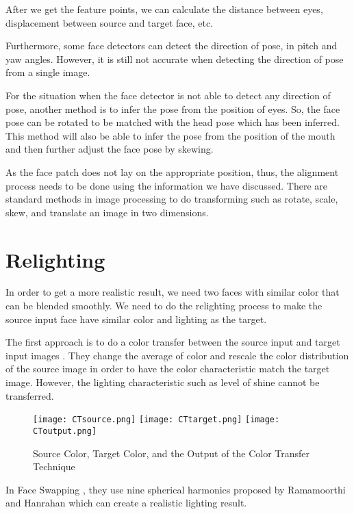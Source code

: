 After we get the feature points, we can calculate the distance between eyes, displacement between source and target face, etc.

Furthermore, some face detectors can detect the direction of pose, in pitch and yaw angles. However, it is still not accurate when detecting the direction of pose from a single image.

For the situation when the face detector is not able to detect any direction of pose, another method is to infer the pose from the position of eyes. So, the face pose can be rotated to be matched with the head pose which has been inferred. This method will also be able to infer the pose from the position of the mouth and then further adjust the face pose by skewing.

As the face patch does not lay on the appropriate position, thus, the alignment process needs to be done using the information we have discussed. There are standard methods in image processing to do transforming such as rotate, scale, skew, and translate an image in two dimensions.


\section{Relighting}
\hspace{0.5in}In order to get a more realistic result, we need two faces with similar color that can be blended smoothly. We need to do the relighting process to make the source input face have similar color and lighting as the target.

The first approach is to do a color transfer between the source input and target input images \cite{Reinhard2001}. They change the average of color and rescale the color distribution of the source image in order to have the color characteristic match the target image. However, the lighting characteristic such as level of shine cannot be transferred.

\begin{figure}[htb]
   \centering
   \texttt{[image: CTsource.png]}
   \texttt{[image: CTtarget.png]}
   \texttt{[image: CToutput.png]}
   \caption{Source Color, Target Color, and the Output of the Color Transfer Technique}
   \label{fig:ColorTransfer}
\end{figure}

In Face Swapping \cite{Bitouk2008}, they use nine spherical harmonics proposed by Ramamoorthi and Hanrahan which can create a realistic lighting result.

